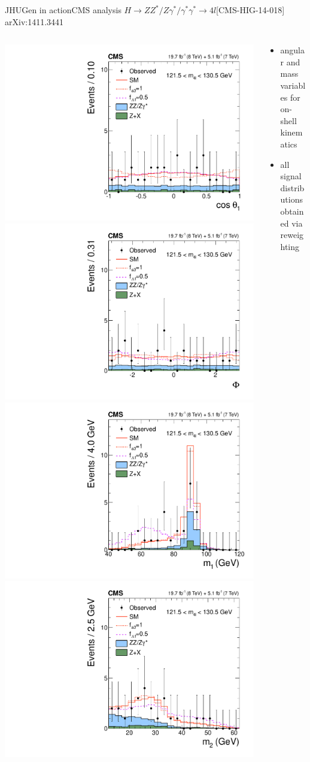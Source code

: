 \documentclass[usenames,dvipsnames,svgnames,table]{beamer}
\begin{document}
\begin{frame}{JHUGen in action}{CMS analysis $H \to ZZ^*/Z\gamma^*/\gamma^*\gamma^* \to 4l$\hfill [CMS-HIG-14-018] arXiv:1411.3441}
\begin{columns}
\begin{column}{0.6\textwidth}
\includegraphics[width=.5\columnwidth]{reweighting/HVV/costheta1}
\includegraphics[width=.5\columnwidth]{reweighting/HVV/Phi} \\
\includegraphics[width=.5\columnwidth]{reweighting/HVV/m1}
\includegraphics[width=.5\columnwidth]{reweighting/HVV/m2}
\end{column}
\begin{column}{0.4\textwidth}
\begin{itemize}
\item angular and mass variables for on-shell kinematics
\item all signal distributions obtained via reweighting
\end{itemize}
\end{column}
\end{columns}
\end{frame}
\end{document}
